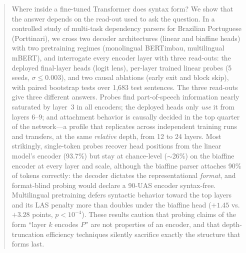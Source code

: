 

\begin{abstract}
Where inside a fine-tuned Transformer does syntax form? We show that the answer
depends on the read-out used to ask the question. In a controlled study of
multi-task dependency parsers for Brazilian Portuguese (Porttinari), we cross
two decoder architectures (linear and biaffine heads) with two pretraining
regimes (monolingual BERTimbau, multilingual mBERT), and interrogate every
encoder layer with three read-outs: the deployed final-layer heads (logit
lens), per-layer trained linear probes (5 seeds, $\sigma \leq 0.003$), and two
causal ablations (early exit and block skip), with paired bootstrap tests over
1{,}683 test sentences. The three read-outs give three different answers.
Probes find part-of-speech information nearly saturated by layer~3 in all
encoders; the deployed heads only \emph{use} it from layers 6--9; and
attachment behavior is causally decided in the top quarter of the network---a
profile that replicates across independent training runs and transfers, at the
same \emph{relative} depth, from 12 to 24 layers. Most strikingly, single-token
probes recover head positions from the linear model's encoder (93.7\%) but
stay at chance-level (\!$\sim$26\%) on the biaffine encoder at every layer and
scale, although the biaffine parser attaches 90\% of tokens correctly: the
decoder dictates the representational \emph{format}, and format-blind probing
would declare a 90-UAS encoder syntax-free. Multilingual pretraining defers
syntactic behavior toward the top layers and its LAS penalty more than doubles
under the biaffine head ($+1.45$ vs.\ $+3.28$ points, $p<10^{-4}$). These
results caution that probing claims of the form ``layer $k$ encodes $P$'' are
not properties of an encoder, and that depth-truncation efficiency techniques
silently sacrifice exactly the structure that forms last.
\end{abstract}

